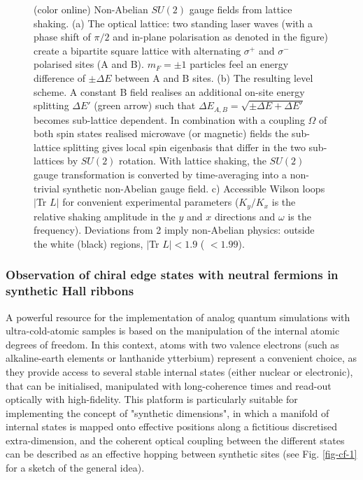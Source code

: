 \documentclass[epj,final]{svjour}
\begin{document}
\begin{figure}[htb]
\begin{center}
\caption{(color online) Non-Abelian $SU(2)$ gauge fields from lattice shaking.
(a) The optical lattice: two standing laser waves (with a phase shift of $\pi/2$ and in-plane polarisation as denoted in the figure) create a bipartite square lattice with alternating $\sigma^+$ and $\sigma^-$ polarised sites (A and B). $m_F = \pm 1$ particles feel an energy difference of $\pm \Delta E$ between A and B sites. (b) The resulting level scheme. A
constant B field realises an additional on-site energy splitting $\Delta E'$ (green arrow) such that $\Delta E_{A,B} =\sqrt{\pm\Delta E + \Delta E'}$ becomes sub-lattice dependent. In combination with a coupling $\Omega$ of both spin states realised microwave (or magnetic) fields the sub-lattice splitting gives local spin eigenbasis that differ in the two sub-lattices by $SU(2)$ rotation. With lattice shaking, the $SU(2)$ gauge transformation is converted by time-averaging into a non-trivial synthetic non-Abelian gauge field. c) Accessible Wilson loops $|$Tr $L|$ for convenient experimental parameters ($K_y/K_x$ is the relative shaking amplitude in the $y$ and $x$ directions and $\omega$ is the frequency). Deviations from 2 imply non-Abelian physics: outside the white (black) regions, $|$Tr $L| < 1.9$ ( $< 1.99$).
} 
\label{fig:fig4_hauke2012non}
\end{center}
\end{figure}

\subsubsection{Observation of chiral edge states with neutral fermions in synthetic Hall ribbons\cite{mancini2015observation}}

A powerful resource for the implementation of analog quantum simulations with ultra-cold-atomic samples is based on the manipulation of the internal atomic degrees of freedom. In this context, atoms with two valence electrons (such as alkaline-earth elements or lanthanide ytterbium) represent a convenient choice, as they provide access to several stable internal states (either nuclear or electronic), that can be initialised, manipulated with long-coherence times and read-out optically with high-fidelity. This platform is particularly suitable for implementing the concept of "synthetic dimensions", in which a manifold of internal states is mapped onto effective positions along a fictitious discretised extra-dimension, and the coherent optical coupling between the different states can be described as an effective hopping between synthetic sites (see Fig. \ref{fig-cf-1} for a sketch of the general idea).
\end{document}
